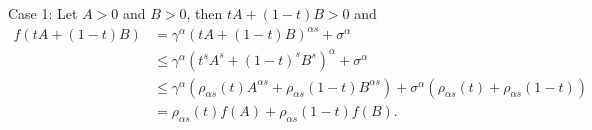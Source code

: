 \documentclass[10pt]{article}
\begin{document}
Case 1: Let $A>0$ and $B>0$, then $tA+(1-t)B >0$ and
\begin{align}
f(tA+(1-t)B ) &= \gamma^\alpha(tA +(1-t) B)^{\alpha s} +\sigma^\alpha   \nonumber
\\&\leq \gamma^\alpha(t^s A^s +(1-t)^s B^s)^{\alpha } +\sigma^\alpha   \nonumber
\\&\leq  \gamma^\alpha( \rho_{\alpha s}(t) A^{\alpha s} +\rho_{\alpha s}(1-t)  B^{\alpha s}) + \sigma^\alpha(\rho_{\alpha s}(t)+\rho_{\alpha s}(1-t))  \nonumber
\\&= \rho_{\alpha s}(t)f(A) + \rho_{\alpha s}(1-t) f(B).                  \nonumber
\end{align}


\end{document}

